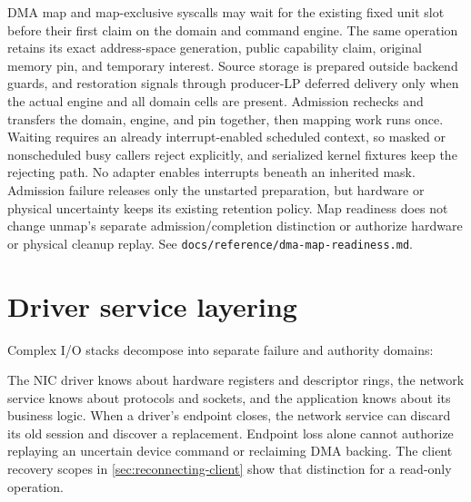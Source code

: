 DMA map and map-exclusive syscalls may wait for the existing fixed unit slot
before their first claim on the domain and command engine. The same operation retains its
exact address-space generation, public capability claim, original memory pin,
and temporary interest. Source storage is prepared outside backend guards, and
restoration signals through producer-LP deferred delivery only when the actual
engine and all domain cells are present. Admission rechecks and transfers the
domain, engine, and pin together, then mapping work runs once. Waiting requires
an already interrupt-enabled scheduled context, so masked or nonscheduled busy
callers reject explicitly, and serialized kernel fixtures keep the rejecting
path. No adapter enables interrupts beneath an inherited mask. Admission failure
releases only the unstarted preparation, but hardware or physical uncertainty keeps
its existing retention policy. Map readiness does not change unmap's separate
admission/completion distinction or authorize hardware or physical cleanup
replay. See \texttt{docs/reference/dma-map-readiness.md}.

\section{Driver service layering}

Complex I/O stacks decompose into separate failure and authority domains:

\begin{center}
\end{center}

The NIC driver knows about hardware registers and descriptor rings, the network
service knows about protocols and sockets, and the application knows about its
business logic. When a driver's endpoint closes, the network service can discard
its old session and discover a replacement. Endpoint loss alone cannot authorize
replaying an uncertain device command or reclaiming DMA backing. The client
recovery scopes in \autoref{sec:reconnecting-client} show that distinction for a
read-only operation.

